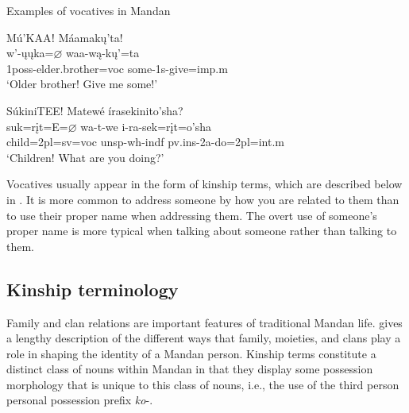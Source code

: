 \begin{exe}

\item\label{VocativeExamples} Examples of vocatives in Mandan

    \begin{xlist}
    
    \item\label{VocativeExamples1} \glll Mú'KAAǃ Máamakų'ta!\\
    w'-ųųka=$\varnothing$ waa-wą-kų'=ta\\
    1poss-\textnormal{elder.brother}=voc \textnormal{some}-1s-\textnormal{give}=imp.m\\
    \glt `Older brother! Give me some!' \citep[139]{hollow1973a}
    
    \item\label{VocativeExamples2} \glll SúkiniTEE! Matewé írasekinito'sha?\\
    suk=rįt=E=$\varnothing$ wa-t-we i-ra-sek=rįt=o'sha\\
    \textnormal{child}=2pl=sv=voc unsp-wh-indf  pv.ins-2a-\textnormal{do}=2pl=int.m\\
    \glt `Children! What are you doing?' \citep[28]{hollow1973a}
    
    \end{xlist}

\end{exe}

Vocatives usually appear in the form of kinship terms, which are described below in . It is more common to address someone by how you are related to them than to use their proper name when addressing them. The overt use of someone's proper name is more typical when talking about someone rather than talking to them.

\subsection{Kinship terminology}\label{SubSecKinshipTerms}

Family and clan relations are important features of traditional Mandan life. \citet[37ff]{bowers1950} gives a lengthy description of the different ways that family, moieties, and clans play a role in shaping the identity of a Mandan person. Kinship terms constitute a distinct class of nouns within Mandan in that they display some possession morphology that is unique to this class of nouns, i.e., the use of the third person personal possession prefix \textit{ko}-.

